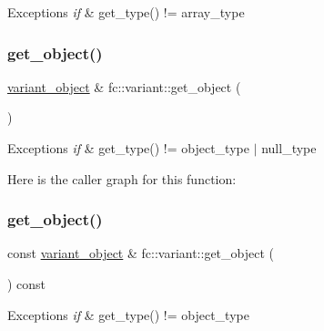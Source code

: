 \begin{DoxyExceptions}{Exceptions}
{\em if} & get\+\_\+type() != array\+\_\+type \\
\hline
\end{DoxyExceptions}
\mbox{\label{classfc_1_1variant_a17a7054a10963360c6a14d60f6e30128}} 
\subsubsection{\texorpdfstring{get\+\_\+object()}{get\_object()}\hspace{0.1cm}{\footnotesize\ttfamily [1/2]}}
{\footnotesize\ttfamily \mbox{\hyperlink{classfc_1_1variant__object}{variant\+\_\+object}} \& fc\+::variant\+::get\+\_\+object (\begin{DoxyParamCaption}{ }\end{DoxyParamCaption})}


\begin{DoxyExceptions}{Exceptions}
{\em if} & get\+\_\+type() != object\+\_\+type $\vert$ null\+\_\+type \\
\hline
\end{DoxyExceptions}
Here is the caller graph for this function\+:
\mbox{\label{classfc_1_1variant_a3efce335057e900b569af78acb1cad6c}} 
\subsubsection{\texorpdfstring{get\+\_\+object()}{get\_object()}\hspace{0.1cm}{\footnotesize\ttfamily [2/2]}}
{\footnotesize\ttfamily const \mbox{\hyperlink{classfc_1_1variant__object}{variant\+\_\+object}} \& fc\+::variant\+::get\+\_\+object (\begin{DoxyParamCaption}{ }\end{DoxyParamCaption}) const}


\begin{DoxyExceptions}{Exceptions}
{\em if} & get\+\_\+type() != object\+\_\+type \\
\hline
\end{DoxyExceptions}
\mbox{\label{classfc_1_1variant_a2ca9f4d2feb8c9743da4128b18bfa886}} 
